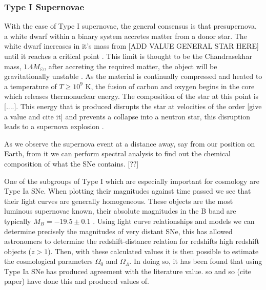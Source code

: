 \documentclass[twocolumn]{revtex4}
\begin{document}
\vspace{-3ex}
\subsubsection{Type I Supernovae}
\vspace{-2ex}
With the case of Type I supernovae, the general consensus is that presupernova, a white dwarf within a binary system accretes matter from a donor star. The white dwarf increases in it's mass from [ADD VALUE GENERAL STAR HERE] until it reaches a critical point \cite{posn, longair}. This limit is thought to be the Chandrasekhar mass, $1.4 M_{\odot}$, after accreting the required matter, the object will be gravitationally unstable \cite{longair}. As the material is continually compressed and heated to a temperature of $T \geq 10^9$ K, the fusion of carbon and oxygen begins in the core which releases thermonuclear energy. The composition of the star at this point is [....]. This energy that is produced disrupts the star at velocities of the order [give a value and cite it] and prevents a collapse into a neutron star, this disruption leads to a supernova explosion \cite{posn}.

As we observe the supernova event at a distance away, say from our position on Earth, from it we can perform spectral analysis to find out the chemical composition of what the SNe contains. [??]

One of the subgroups of Type I which are especially important for cosmology are Type Ia SNe. When plotting their magnitudes against time passed we see that their light curves are generally homogeneous. These objects are the most luminous supernovae known, their absolute magnitudes in the B band are typically $M_B = -19.5 \pm 0.1$ \cite{posn}. Using light curve relationships and models we can determine precisely the magnitudes of very distant SNe, this has allowed astronomers to determine the redshift-distance relation for redshifts high redshift objects ($z>1$). Then, with these calculated values it is then possible to estimate the cosmological parameters $\Omega_0$ and $\Omega_\Lambda$. In doing so, it has been found that using Type Ia SNe has produced agreement with the literature value. so and so (cite paper) have done this and produced values of. 

\vspace{-3ex}
\end{document}
